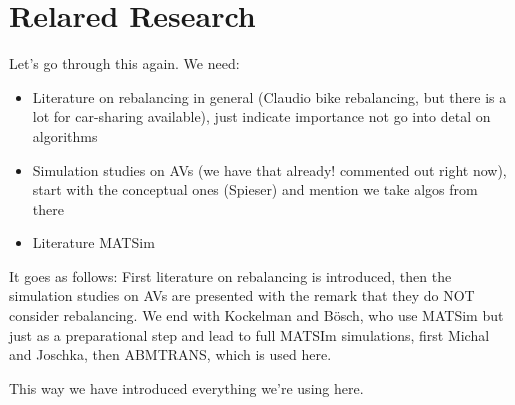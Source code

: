 \section{Relared Research}
\label{subs:literatureResearch}

Let's go through this again. We need:

\begin{itemize}
\item Literature on rebalancing in general (Claudio bike rebalancing, but there is a lot for car-sharing available), just indicate importance not go into detal on algorithms
\item Simulation studies on AVs (we have that already! commented out right now), start with the conceptual ones (Spieser) and mention we take algos from there
\item Literature MATSim
\end{itemize}



It goes as follows: First literature on rebalancing is introduced, then the simulation studies on AVs
are presented with the remark that they do NOT consider rebalancing. We end with Kockelman and Bösch,
who use MATSim but just as a preparational step and lead to full MATSIm simulations, first Michal and Joschka,
then ABMTRANS, which is used here.

This way we have introduced everything we're using here.


